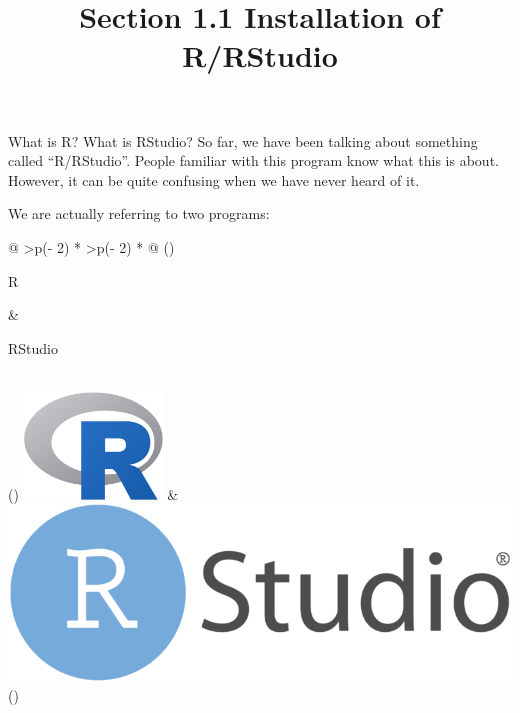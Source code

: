 \documentclass[
  ignorenonframetext,
]{beamer}
\title{Section 1.1 Installation of R/RStudio}
\author{}
\date{}
\begin{document}
\frame{\titlepage}
\ifdefined\Shaded\renewenvironment{Shaded}{\begin{tcolorbox}[borderline west={3pt}{0pt}{shadecolor}, enhanced, boxrule=0pt, sharp corners, frame hidden, breakable, interior hidden]}{\end{tcolorbox}}\fi

\begin{frame}
\end{frame}

\begin{frame}{What is R? What is RStudio?}
\protect\hypertarget{what-is-r-what-is-rstudio}{}
So far, we have been talking about something called ``R/RStudio''.
People familiar with this program know what this is about. However, it
can be quite confusing when we have never heard of it.

We are actually referring to two programs:

\begin{longtable}[]{@{}
  >{\centering\arraybackslash}p{(\columnwidth - 2\tabcolsep) * }
  >{\centering\arraybackslash}p{(\columnwidth - 2\tabcolsep) * }@{}}
\toprule()
\begin{minipage}[b]{\linewidth}\centering
R
\end{minipage} & \begin{minipage}[b]{\linewidth}\centering
RStudio
\end{minipage} \\
\midrule()
\endhead
\includegraphics[width=1.44792in,height=\textheight]{./assets/images/R_logo.png}
& \includegraphics{./assets/images/RStudio_Logo.png} \\
\bottomrule()
\end{longtable}


\end{frame}
\end{document}

